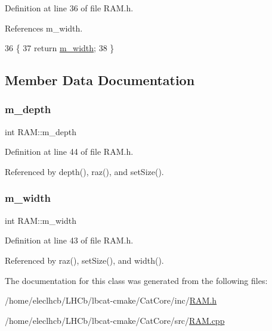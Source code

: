 Definition at line 36 of file R\+A\+M.\+h.



References m\+\_\+width.


\begin{DoxyCode}
36              \{
37     \textcolor{keywordflow}{return} \hyperlink{classRAM_a9921651055311f968a843e2931f45164}{m\_width};
38   \}
\end{DoxyCode}


\subsection{Member Data Documentation}
\mbox{\label{classRAM_a7f23b0ac79ae5d954c968814c628ac53}} 
\subsubsection{\texorpdfstring{m\+\_\+depth}{m\_depth}}
{\footnotesize\ttfamily int R\+A\+M\+::m\+\_\+depth\hspace{0.3cm}{\ttfamily [private]}}



Definition at line 44 of file R\+A\+M.\+h.



Referenced by depth(), raz(), and set\+Size().

\mbox{\label{classRAM_a9921651055311f968a843e2931f45164}} 
\subsubsection{\texorpdfstring{m\+\_\+width}{m\_width}}
{\footnotesize\ttfamily int R\+A\+M\+::m\+\_\+width\hspace{0.3cm}{\ttfamily [private]}}



Definition at line 43 of file R\+A\+M.\+h.



Referenced by raz(), set\+Size(), and width().



The documentation for this class was generated from the following files\+:\begin{DoxyCompactItemize}
\item 
/home/eleclhcb/\+L\+H\+Cb/lbcat-\/cmake/\+Cat\+Core/inc/\hyperlink{RAM_8h}{R\+A\+M.\+h}\item 
/home/eleclhcb/\+L\+H\+Cb/lbcat-\/cmake/\+Cat\+Core/src/\hyperlink{RAM_8cpp}{R\+A\+M.\+cpp}\end{DoxyCompactItemize}
